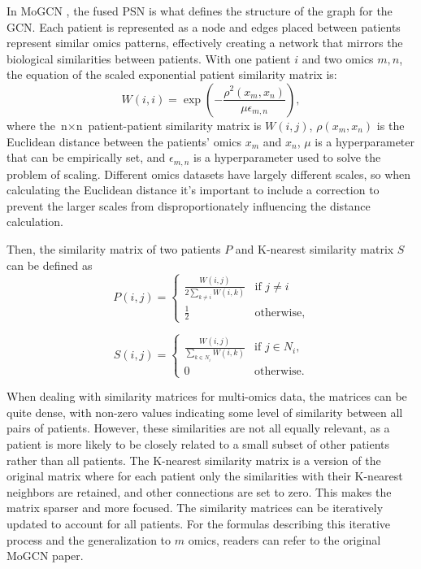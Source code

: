 \documentclass[unnumsec,webpdf,modern,large]{oup-authoring-template}
\theoremstyle{thmstyleone}%
\theoremstyle{thmstyletwo}%
\theoremstyle{thmstylethree}%
\begin{document}
In MoGCN \cite{Li2022}, the fused PSN is what defines the structure of the graph for the GCN. Each patient is represented as a node and edges placed between patients represent similar omics patterns, effectively creating a network that mirrors the biological similarities between patients. With one patient $i$ and two omics $m, n$, the equation of the scaled exponential patient similarity matrix is:
\begin{equation}
    W(i, i) = \exp\left( -\frac{\rho^2(x_m , x_n)}{\mu \epsilon_{m, n}} \right),\label{PSN}
\end{equation}
where the ${\text{n} \times \text{n}}$ patient-patient similarity matrix is $W(i, j)$, $\rho(x_m, x_n)$ is the Euclidean distance between the patients' omics $x_m$ and $x_n$, $\mu$ is a hyperparameter that can be empirically set, and $\epsilon_{m, n}$ is a hyperparameter used to solve the problem of scaling. Different omics datasets have largely different scales, so when calculating the Euclidean distance it’s important to include a correction to prevent the larger scales from disproportionately influencing the distance calculation.

\par Then, the similarity matrix of two patients $P$ and K-nearest similarity matrix $S$ can be defined as
\begin{equation}
    P(i, j) = \begin{cases} 
    \frac{W(i, j)}{2\sum_{k \neq i} W(i,k)} & \mbox{if }j \neq i \\ 
    \frac{1}{2} & \mbox{otherwise},
    \end{cases}\label{SNF}
\end{equation}

\begin{equation}
    S(i, j) = \begin{cases} 
    \frac{W(i, j)}{\sum_{k \in N_i} W(i,k)} & \mbox{if }j \in N_i, \\ 
    0 & \mbox{otherwise}.
    \end{cases}\label{KSNF}
\end{equation}

When dealing with similarity matrices for multi-omics data, the matrices can be quite dense, with non-zero values indicating some level of similarity between all pairs of patients. However, these similarities are not all equally relevant, as a patient is more likely to be closely related to a small subset of other patients rather than all patients. The K-nearest similarity matrix is a version of the original matrix where for each patient only the similarities with their K-nearest neighbors are retained, and other connections are set to zero. This makes the matrix sparser and more focused. The similarity matrices can be iteratively updated to account for all patients. For the formulas describing this iterative process and the generalization to $m$ omics, readers can refer to the original MoGCN paper.
\end{document}
